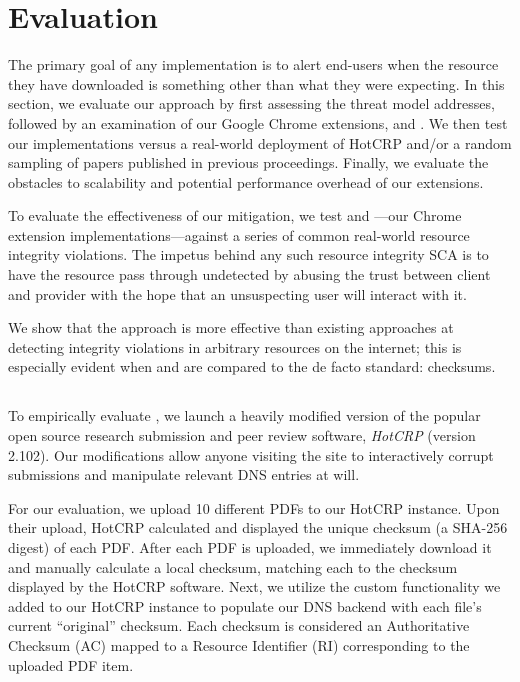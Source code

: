 \section{Evaluation} \label{sec:evaluation}

The primary goal of any \SYSTEM{} implementation is to alert end-users when the
resource they have downloaded is something other than what they were expecting.
In this section, we evaluate our approach by first assessing the threat model
\SYSTEM{} addresses, followed by an examination of our Google Chrome extensions,
\DNSSYS{} and \DHTSYS{}. We then test our implementations versus a real-world
deployment of HotCRP and/or a random sampling of papers published in previous
\CONFERENCE{} proceedings. Finally, we evaluate the obstacles to scalability and
potential performance overhead of our extensions.


To evaluate the effectiveness of our mitigation, we test \DNSSYS{} and
\DHTSYS{}---our \SYSTEM{} Chrome extension implementations---against a series of
common real-world resource integrity violations. The impetus behind any such
resource integrity SCA is to have the resource pass through undetected by
abusing the trust between client and provider with the hope that an unsuspecting
user will interact with it.

We show that the \SYSTEM{} approach is more effective than existing approaches
at detecting integrity violations in arbitrary resources on the internet; this
is especially evident when \DNSSYS{} and \DHTSYS{} are compared to the de facto
standard: checksums.

\subsection{\DNSSYS{}}

To empirically evaluate \DNSSYS{}, we launch a heavily modified version of the
popular open source research submission and peer review software, \emph{HotCRP}
(version 2.102). Our modifications allow anyone visiting the site to
interactively corrupt submissions and manipulate relevant DNS entries at will.

For our evaluation, we upload 10 different \CONFERENCE{} PDFs to our HotCRP
instance. Upon their upload, HotCRP calculated and displayed the unique checksum
(a SHA-256 digest) of each PDF. After each PDF is uploaded, we immediately
download it and manually calculate a local checksum, matching each to the
checksum displayed by the HotCRP software. Next, we utilize the custom
functionality we added to our HotCRP instance to populate our DNS backend with
each file's current ``original'' checksum. Each checksum is considered an
Authoritative Checksum (AC) mapped to a Resource Identifier (RI) corresponding
to the uploaded PDF item.

